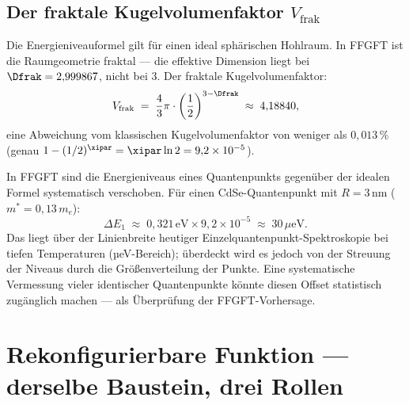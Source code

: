 \subsection{Der fraktale Kugelvolumenfaktor \texorpdfstring{$V_{\text{frak}}$}{V\_frak}}
\label{sec:kfrak}

Die Energieniveauformel gilt für einen ideal sphärischen Hohlraum.
In FFGFT ist die Raumgeometrie fraktal --- die effektive Dimension
liegt bei $\Dfrak = 2{,}999867$, nicht bei 3.
Der fraktale Kugelvolumenfaktor:
\begin{equation}
  V_{\text{frak}} \;=\; \frac{4}{3}\pi \cdot
  \left(\frac{1}{2}\right)^{3 - \Dfrak}
  \;\approx\; 4{,}18840,
\end{equation}
eine Abweichung vom klassischen Kugelvolumenfaktor von weniger
als $0{,}013\,\%$ (genau $1 - (1/2)^{\xipar} = \xipar\ln 2 = 9{,}2 \times 10^{-5}$).

\begin{keyresult}
In FFGFT sind die Energieniveaus eines Quantenpunkts gegenüber
der idealen Formel systematisch verschoben. Für einen CdSe-Quantenpunkt
mit $R = 3$\,nm ($m^* = 0{,}13\,m_e$):
\[
  \Delta E_1 \;\approx\; 0{,}321\,\text{eV} \times 9{,}2 \times 10^{-5}
  \;\approx\; 30\,\mu\text{eV}.
\]
Das liegt über der Linienbreite heutiger
Einzelquantenpunkt-Spektroskopie bei tiefen Temperaturen (µeV-Bereich);
überdeckt wird es jedoch von der Streuung der Niveaus durch die Größenverteilung der Punkte.
Eine systematische Vermessung vieler identischer Quantenpunkte
könnte diesen Offset statistisch zugänglich machen ---
als Überprüfung der FFGFT-Vorhersage.
\end{keyresult}

\section{Rekonfigurierbare Funktion --- derselbe Baustein, drei Rollen}
\label{sec:rollen}

\begin{center}
\end{center}

